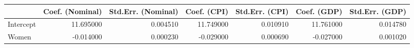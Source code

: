 \begin{tabular}{lrrrrrr}
\toprule
 & Coef. (Nominal) & Std.Err. (Nominal) & Coef. (CPI) & Std.Err. (CPI) & Coef. (GDP) & Std.Err. (GDP) \\
\midrule
Intercept & 11.695000 & 0.004510 & 11.749000 & 0.010910 & 11.761000 & 0.014780 \\
Women & -0.014000 & 0.000230 & -0.029000 & 0.000690 & -0.027000 & 0.001020 \\
\bottomrule
\end{tabular}
